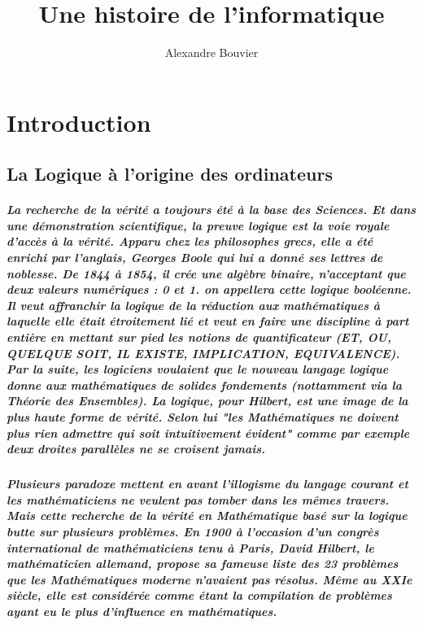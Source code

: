 \documentclass[a4paper, 11pt]{book}
\begin{document}
\title{Une histoire de l'informatique}
\author{Alexandre Bouvier}
\date{}

\mainmatter

\maketitle

\chapter*{Introduction}

\section*{La Logique à l'origine des ordinateurs}

\paragraph{
  La recherche de la vérité a toujours été à la base des Sciences. Et dans une démonstration scientifique, la preuve logique est la voie royale d'accès à la vérité. Apparu chez les philosophes grecs, elle a été enrichi par l'anglais, Georges Boole qui lui a donné ses lettres de noblesse. De 1844 à 1854, il crée une algèbre binaire, n'acceptant que deux valeurs numériques : 0 et 1. on appellera cette logique booléenne. Il veut affranchir la logique de la réduction aux mathématiques à laquelle elle était étroitement lié et veut en faire une discipline à part entière en mettant sur pied les notions de quantificateur (ET, OU, QUELQUE SOIT, IL EXISTE, IMPLICATION, EQUIVALENCE). Par la suite, les logiciens voulaient que le nouveau langage logique donne aux mathématiques de solides fondements (nottamment via la Théorie des Ensembles). La logique, pour Hilbert, est une image de la plus haute forme de vérité. Selon lui "les Mathématiques ne doivent plus rien admettre  qui soit intuitivement évident" comme par exemple deux droites parallèles ne se croisent jamais.
}

\paragraph{
  Plusieurs paradoxe mettent en avant l'illogisme du langage courant et les mathématiciens ne veulent pas tomber dans les mêmes travers. Mais cette recherche de la vérité en Mathématique basé sur la logique butte sur plusieurs problèmes. En 1900 à l'occasion d'un congrès international de mathématiciens tenu à Paris, David Hilbert, le mathématicien allemand, propose sa fameuse liste des 23 problèmes que les Mathématiques moderne n'avaient pas résolus. Même au XXIe siècle, elle est considérée comme étant la compilation de problèmes ayant eu le plus d'influence en mathématiques.
}
\end{document}
